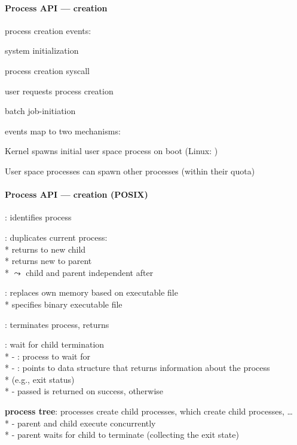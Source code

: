 \paragraph{Process API --- creation}
\begin{items}
  \item process creation events:
  \begin{enumeration}
    \item system initialization
    \item process creation syscall
    \item user requests process creation
    \item batch job-initiation
  \end{enumeration}
  \item events map to two mechanisms:
  \begin{enumeration}
    \item Kernel spawns initial user space process on boot (Linux: )
    \item User space processes can spawn other processes (within their quota)
  \end{enumeration}
\end{items}

\paragraph{Process API --- creation (POSIX)}
\begin{items}
  \item {}: identifies process
  \item {}: duplicates current process: \\*
    returns  to new child \\*
    returns new  to parent \\*
    \( \leadsto \) child and parent independent after 
  \item {}: replaces own memory based on executable file \\*
     specifies binary executable file
  \item {}: terminates process, returns 
  \item {}: wait for child termination \\*
    - : process to wait for \\*
    - : points to data structure that returns information about the process \\*  (e.g., exit status) \\*
    - passed  is returned on success,  otherwise
  \item \textbf{process tree}: processes create child processes, which create child processes, \dots \\*
    - parent and child execute concurrently \\*
    - parent waits for child to terminate (collecting the exit state)
\end{items}

